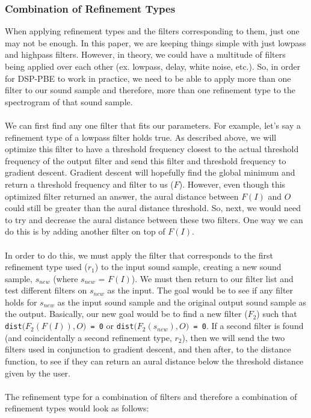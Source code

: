 \subsubsection{Combination of Refinement Types}

When applying refinement types and the filters corresponding to them, just one may not be enough. In this paper, we are keeping things simple with just lowpass and highpass filters. However, in theory, we could have a multitude of filters being applied over each other (ex. lowpass, delay, white noise, etc.). So, in order for DSP-PBE to work in practice, we need to be able to apply more than one filter to our sound sample and therefore, more than one refinement type to the spectrogram of that sound sample. \\ \\
We can first find any one filter that fits our parameters. For example, let's say a refinement type of a lowpass filter holds true. As described above, we will optimize this filter to have a threshold frequency closest to the actual threshold frequency of the output filter and send this filter and threshold frequency  to gradient descent. Gradient descent will hopefully find the global minimum and return a threshold frequency and filter to us ($F$). However, even though this optimized filter returned an answer, the aural distance between $F(I)$ and $O$ could still be greater than the aural distance threshold. So, next, we would need to try and decrease the aural distance between these two filters. One way we can do this is by adding another filter on top of $F(I)$. \\ \\
In order to do this, we must apply the filter that corresponds to the first refinement type used ($r_1$) to the input sound sample, creating a new sound sample, $s_{new}$ (where $s_{new}$ = $F(I)$). We must then return to our filter list and test different filters on $s_{new}$ as the input. The goal would be to see if any filter holds for $s_{new}$ as the input sound sample and the original output sound sample as the output. Basically, our new goal would be to find a new filter ($F_2$) such that \texttt{dist}$(F_2$$(F(I)), O)$\texttt{ = 0} or \texttt{dist}$(F_2$$(s_{new}), O)$\texttt{ = 0}. If a second filter is found (and coincidentally a second refinement type, $r_2$), then we will send the two filters used in conjunction to gradient descent, and then after, to the distance function, to see if they can return an aural distance below the threshold distance given by the user. \\ \\
The refinement type for a combination of filters and therefore a combination of refinement types would look as follows: \\

